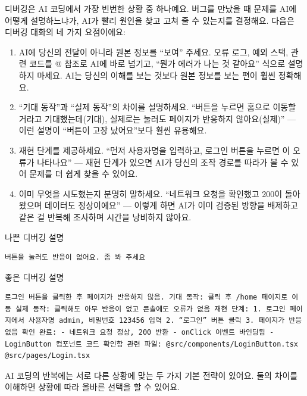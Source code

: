 
디버깅은 AI 코딩에서 가장 빈번한 상황 중 하나예요. 버그를 만났을 때 문제를 AI에 어떻게 설명하느냐가, AI가 빨리 원인을 찾고 고쳐 줄 수 있는지를 결정해요. 다음은 디버깅 대화의 네 가지 요점이에요:

\begin{enumerate}
  \item AI에 당신의 전달이 아니라 원본 정보를 “보여” 주세요. 오류 로그, 예외 스택, 관련 코드를 @ 참조로 AI에 바로 넘기고, “뭔가 에러가 나는 것 같아요” 식으로 설명하지 마세요. AI는 당신의 이해를 보는 것보다 원본 정보를 보는 편이 훨씬 정확해요.
  \item “기대 동작”과 “실제 동작”의 차이를 설명하세요. “버튼을 누르면 홈으로 이동할 거라고 기대했는데(기대), 실제로는 눌러도 페이지가 반응하지 않아요(실제)” — 이런 설명이 “버튼이 고장 났어요”보다 훨씬 유용해요.
  \item 재현 단계를 제공하세요. “먼저 사용자명을 입력하고, 로그인 버튼을 누르면 이 오류가 나타나요” — 재현 단계가 있으면 AI가 당신의 조작 경로를 따라가 볼 수 있어 문제를 더 쉽게 찾을 수 있어요.
  \item 이미 무엇을 시도했는지 분명히 말하세요. “네트워크 요청을 확인했고 200이 돌아왔으며 데이터도 정상이에요” — 이렇게 하면 AI가 이미 검증된 방향을 배제하고 같은 걸 반복해 조사하며 시간을 낭비하지 않아요.
\end{enumerate}

나쁜 디버깅 설명

\begin{lstlisting}
버튼을 눌러도 반응이 없어요. 좀 봐 주세요
\end{lstlisting}

좋은 디버깅 설명

\begin{lstlisting}
로그인 버튼을 클릭한 후 페이지가 반응하지 않음. 기대 동작: 클릭 후 /home 페이지로 이동 실제 동작: 클릭해도 아무 반응이 없고 콘솔에도 오류가 없음 재현 단계: 1. 로그인 페이지에서 사용자명 admin, 비밀번호 123456 입력 2. “로그인” 버튼 클릭 3. 페이지가 반응 없음 확인 완료: - 네트워크 요청 정상, 200 반환 - onClick 이벤트 바인딩됨 - LoginButton 컴포넌트 코드 확인함 관련 파일: @src/components/LoginButton.tsx @src/pages/Login.tsx
\end{lstlisting}


AI 코딩의 반복에는 서로 다른 상황에 맞는 두 가지 기본 전략이 있어요. 둘의 차이를 이해하면 상황에 따라 올바른 선택을 할 수 있어요.

